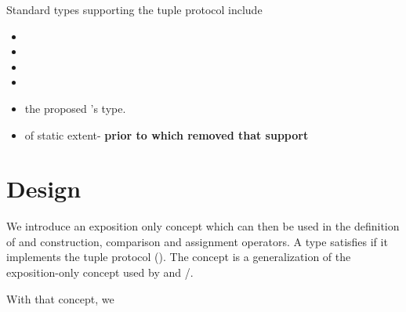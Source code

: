 \documentclass{wg21}
\begin{document}
%
%
%
Standard types supporting the tuple protocol include

\begin{itemize}
\item {}
\item {}
\item {}
\item {}
\item the proposed 's  type.
\item {} of static extent- \textbf{prior to  which removed that support}
\end{itemize}

%


\section{Design}

We introduce an exposition only concept  which can then be used in the definition of  and  construction,
comparison and assignment operators.
A type satisfies  if it implements the tuple protocol ().
The concept is a generalization of the  exposition-only concept used by  and /.

With that concept, we
\end{document}
